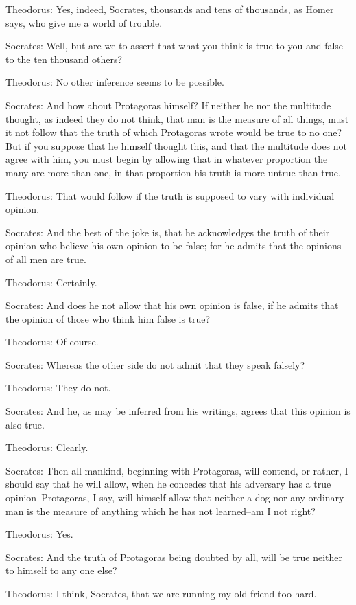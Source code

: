 Theodorus: Yes, indeed, Socrates, thousands and tens of thousands, as
Homer says, who give me a world of trouble.

Socrates: Well, but are we to assert that what you think is true to you
and false to the ten thousand others?

Theodorus: No other inference seems to be possible.

Socrates: And how about Protagoras himself? If neither he nor the
multitude thought, as indeed they do not think, that man is the measure
of all things, must it not follow that the truth of which Protagoras
wrote would be true to no one? But if you suppose that he himself
thought this, and that the multitude does not agree with him, you must
begin by allowing that in whatever proportion the many are more than
one, in that proportion his truth is more untrue than true.

Theodorus: That would follow if the truth is supposed to vary with
individual opinion.

Socrates: And the best of the joke is, that he acknowledges the truth
of their opinion who believe his own opinion to be false; for he admits
that the opinions of all men are true.

Theodorus: Certainly.

Socrates: And does he not allow that his own opinion is false, if he
admits that the opinion of those who think him false is true?

Theodorus: Of course.

Socrates: Whereas the other side do not admit that they speak falsely?

Theodorus: They do not.

Socrates: And he, as may be inferred from his writings, agrees that this
opinion is also true.

Theodorus: Clearly.

Socrates: Then all mankind, beginning with Protagoras, will contend,
or rather, I should say that he will allow, when he concedes that his
adversary has a true opinion--Protagoras, I say, will himself allow that
neither a dog nor any ordinary man is the measure of anything which he
has not learned--am I not right?

Theodorus: Yes.

Socrates: And the truth of Protagoras being doubted by all, will be true
neither to himself to any one else?

Theodorus: I think, Socrates, that we are running my old friend too
hard.

